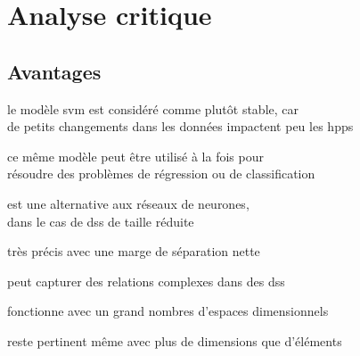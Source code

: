 \section{Analyse critique}


\subsection{Avantages}


\begin{itmz}

\item{le modèle \gls{svm} est considéré comme plutôt stable, car\\
de petits changements dans les données impactent peu les \glspl{hpp}}

\end{itmz}\begin{itmz}

\item{ce même modèle peut être utilisé à la fois pour\\
résoudre des problèmes de régression ou de classification}

\end{itmz}\begin{itmz}

\item{est une alternative aux réseaux de neurones,\\
dans le cas de \glspl{ds} de taille réduite}

\end{itmz}\begin{itmz}

\item{très précis avec une marge de séparation nette}

\end{itmz}\begin{itmz}

\item{peut capturer des relations complexes dans des \glspl{ds}}

\end{itmz}\begin{itmz}

\item{fonctionne avec un grand nombres d’espaces dimensionnels}

\end{itmz}\begin{itmz}

\item{reste pertinent même avec plus de dimensions que d’éléments}


\end{itmz}
